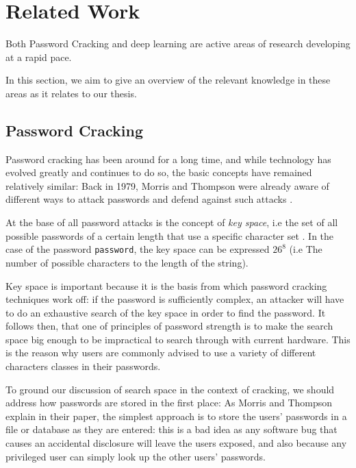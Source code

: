 
\section{Related Work}
Both Password Cracking and deep learning are active areas of research developing at a rapid pace.

In this section, we aim to give an overview of the relevant knowledge in these areas as it relates to our thesis.

\subsection{Password Cracking}
Password cracking has been around for a long time, and while technology has evolved greatly and continues to do so, the basic concepts have remained relatively similar:
Back in 1979, Morris and Thompson were already aware of different ways to attack passwords and defend against such attacks \cite{Thompson1979}.

At the base of all password attacks is the concept of \emph{key space}, i.e the set of all possible passwords of a certain length that use a specific character set \cite{Thompson1979,hash_cat_mask_attack}. 
In the case of the password \texttt{password}, the key space can be expressed $26^8$ (i.e The number of possible characters to the length of the string).

Key space is important because it is the basis from which password cracking techniques work off: if the password is sufficiently complex, an attacker will have to do an exhaustive search of the key space in order to find the password. 
It follows then, that one of principles of password strength is to make the search space big enough to be impractical to search through with current hardware.
This is the reason why users are commonly advised to use a variety of different characters classes in their passwords.\newline

To ground our discussion of search space in the context of cracking, we should address how passwords are stored in the first place: As Morris and Thompson explain in their paper, the simplest approach is to store the users' passwords in a file or database as they are entered: this is a bad idea as any software bug that causes an accidental disclosure will leave the users exposed, and also because any privileged user can simply look up the other users' passwords.

